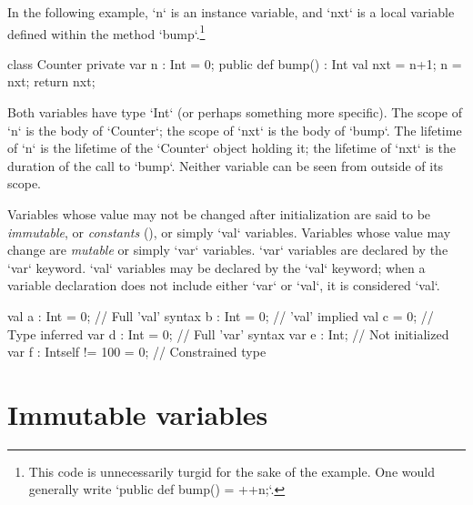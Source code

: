 In the following example, \xcd`n` is an instance variable, and \xcd`nxt` is a
local variable defined within the method \xcd`bump`.\footnote{This code is
unnecessarily turgid for the sake of the example.  One would generally write
\xcd`public def bump() = ++n;`.   }
\begin{xten}
class Counter {
  private var n : Int = 0;
  public def bump() : Int {
    val nxt = n+1;
    n = nxt;
    return nxt;
    }
}
\end{xten}
%
Both variables have type \xcd`Int` (or
perhaps something more specific).    The scope of \xcd`n` is the body of
\xcd`Counter`; the scope of \xcd`nxt` is the body of \xcd`bump`.  The
lifetime of \xcd`n` is the lifetime of the \xcd`Counter` object holding it;
the lifetime of \xcd`nxt` is the duration of the call to \xcd`bump`. Neither
variable can be seen from outside of its scope.

\label{exploded-syntax}
\label{VariableDeclarations}


Variables whose value may not be changed after initialization are said to be
{\em immutable}, or {\em constants} (), or simply
\xcd`val` variables. Variables whose value may change are {\em mutable} or
simply \xcd`var` variables. \xcd`var` variables are declared by the \xcd`var`
keyword. \xcd`val` variables may be declared by the \xcd`val` keyword; when a
variable declaration does not include either \xcd`var` or \xcd`val`, it is
considered \xcd`val`. 


\begin{xten}
val a : Int = 0;               // Full 'val' syntax
b : Int = 0;                   // 'val' implied
val c = 0;                     // Type inferred
var d : Int = 0;               // Full 'var' syntax
var e : Int;                   // Not initialized
var f : Int{self != 100} = 0;  // Constrained type
\end{xten}







\section{Immutable variables}
\label{FinalVariables}

